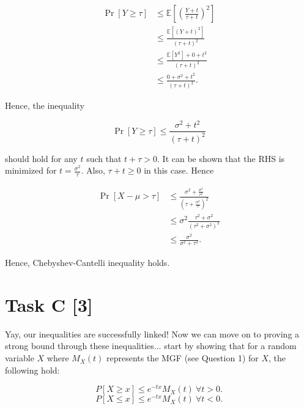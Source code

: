 \begin{equation*}
    \begin{aligned}
        \Pr[Y\ge\tau] &\le \mathbb{E}\left[\left(\frac{Y+t}
        {\tau+t}\right)^2\right] \\
        &\le \frac{\mathbb{E}[(Y+t)^2]}{(\tau+t)^2} \\
        &\le \frac{\mathbb{E}[Y^2]+0+t^2}{(\tau+t)^2} \\
        &\le \frac{0+\sigma^2+t^2}{(\tau+t)^2}.
    \end{aligned}
\end{equation*}

Hence, the inequality

\begin{equation*}
    \Pr[Y\ge\tau]\le \frac{\sigma^2+t^2}{(\tau+t)^2}
\end{equation*}

should hold for any $t$ such that $t+\tau>0$. It can be shown that the RHS is
minimized for $t=\frac{\sigma^2}{\tau}$. Also, $\tau+t\ge 0$ in this case. Hence

\begin{equation*}
    \begin{aligned}
        \Pr[X-\mu>\tau] &\le \frac{\sigma^2+\frac{\sigma^4}{\tau^2}}
        {\left(\tau+\frac{\sigma^2}{\tau}\right)^2} \\
        &\le \sigma^2\frac{\tau^2+\sigma^2}{(\tau^2+\sigma^2)^2} \\
        &\le \frac{\sigma^2}{\sigma^2+\tau^2}.
    \end{aligned}
\end{equation*}

Hence, Chebyshev-Cantelli inequality holds.

\section*{\colS{$\S$} Task C \hfill \normalfont \large [3]}

\begin{tcolorbox}
    Yay, our inequalities are successfully linked! Now we can move on to proving a
    strong bound through these inequalities... start by showing that for a
    random variable $X$ where $M_X(t)$ represents the MGF (see Question 1) for
    $X$, the following hold:

    \begin{equation*}
        P[X \ge x] \le e^{-tx} M_X(t) \ \forall t > 0.
    \end{equation*}
    \begin{equation*}
        P[X \le x] \le e^{-tx} M_X(t) \ \forall t < 0.
    \end{equation*}
\end{tcolorbox}

